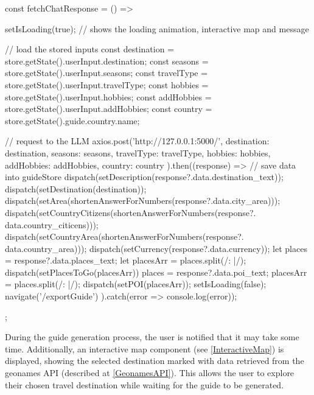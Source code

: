 \documentclass[english,notitlepage,smartquotes]{hgbreport}
\begin{document}
\begin{JsCode}
	const fetchChatResponse = () => {
		setIsLoading(true); // shows the loading animation, interactive map and message
		
		// load the stored inputs
		const destination = store.getState().userInput.destination;
		const seasons = store.getState().userInput.seasons;
		const travelType = store.getState().userInput.travelType;
		const hobbies = store.getState().userInput.hobbies;
		const addHobbies = store.getState().userInput.addHobbies;
		const country = store.getState().guide.country.name;
		
		// request to the LLM
		axios.post('http://127.0.0.1:5000/', {
			destination: destination,
			seasons: seasons,
			travelType: travelType,
			hobbies: hobbies,
			addHobbies: addHobbies,
			country: country
		}).then((response) => {
			// save data into guideStore
			dispatch(setDescription(response?.data.destination_text));
			dispatch(setDestination(destination));
			dispatch(setArea(shortenAnswerForNumbers(response?.data.city_area)));
			dispatch(setCountryCitizens(shortenAnswerForNumbers(response?.
				data.country_citicens)));
			dispatch(setCountryArea(shortenAnswerForNumbers(response?.
				data.country_area)));
			dispatch(setCurrency(response?.data.currency));
			let places = response?.data.places_text;
			let placesArr = places.split(/: |\n\n/);
			dispatch(setPlacesToGo(placesArr))
			places = response?.data.poi_text;
			placesArr = places.split(/: |\n\n/);
			dispatch(setPOI(placesArr));
			setIsLoading(false);
			navigate('/exportGuide')
		}).catch(error => console.log(error));
	};
\end{JsCode}

During the guide generation process, the user is notified that it may take some time. Additionally, an interactive map component (see \ref{InteractiveMap}) is displayed, showing the selected destination marked with data retrieved from the geonames API (described at \ref{GeonamesAPI}). This allows the user to explore their chosen travel destination while waiting for the guide to be generated.
\end{document}
